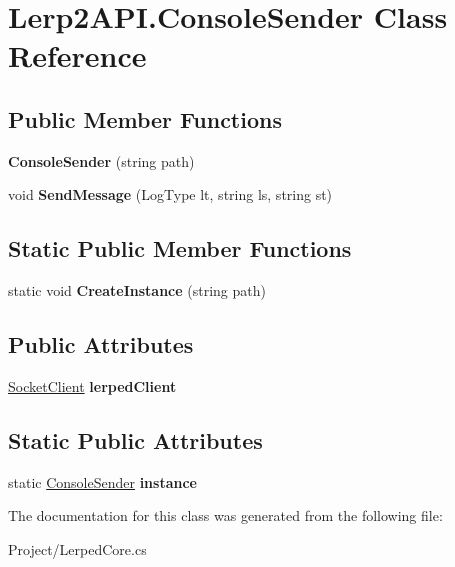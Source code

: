 \hypertarget{class_lerp2_a_p_i_1_1_console_sender}{}\section{Lerp2\+A\+P\+I.\+Console\+Sender Class Reference}
\label{class_lerp2_a_p_i_1_1_console_sender}
\subsection*{Public Member Functions}
\begin{DoxyCompactItemize}
\item 
\mbox{\label{class_lerp2_a_p_i_1_1_console_sender_a9d97c8171ec717937c16ed9d7408062b}} 
{\bfseries Console\+Sender} (string path)
\item 
\mbox{\label{class_lerp2_a_p_i_1_1_console_sender_a99dda76f7b5e67426ea3a68b7a1f3b8a}} 
void {\bfseries Send\+Message} (Log\+Type lt, string ls, string st)
\end{DoxyCompactItemize}
\subsection*{Static Public Member Functions}
\begin{DoxyCompactItemize}
\item 
\mbox{\label{class_lerp2_a_p_i_1_1_console_sender_ac71c6d5e24ce1a27f8de614ec393e17c}} 
static void {\bfseries Create\+Instance} (string path)
\end{DoxyCompactItemize}
\subsection*{Public Attributes}
\begin{DoxyCompactItemize}
\item 
\mbox{\label{class_lerp2_a_p_i_1_1_console_sender_a6b5be36001e4cac83e8adf2b5b2dba1e}} 
\hyperlink{class_lerp2_a_p_i_1_1_communication_1_1_sockets_1_1_socket_client}{Socket\+Client} {\bfseries lerped\+Client}
\end{DoxyCompactItemize}
\subsection*{Static Public Attributes}
\begin{DoxyCompactItemize}
\item 
\mbox{\label{class_lerp2_a_p_i_1_1_console_sender_abe27a000639cba703eb80420b6eb5609}} 
static \hyperlink{class_lerp2_a_p_i_1_1_console_sender}{Console\+Sender} {\bfseries instance}
\end{DoxyCompactItemize}


The documentation for this class was generated from the following file\+:\begin{DoxyCompactItemize}
\item 
Project/Lerped\+Core.\+cs\end{DoxyCompactItemize}

